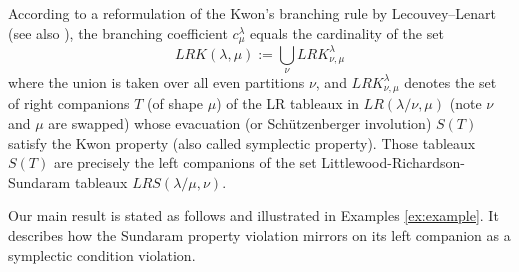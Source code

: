 \documentclass[reqno]{amsart}
\theoremstyle{tplain}
\begin{document}
According  to a reformulation of the Kwon’s branching rule by Lecouvey–Lenart \cite[Section 8]{leclen} (see also \cite{sathishtorres}),
the branching coefficient
$c^\lambda_\mu$
equals the cardinality of the set
$$
LRK(\lambda,\mu):=\bigcup_\nu
LRK^\lambda_{\nu,\mu}$$
where the union is taken over all even partitions $\nu$, and $LRK^\lambda_{\nu,\mu}$ denotes the set of right companions $T$ (of shape $\mu$) of the  LR tableaux in $LR(\lambda/\nu,\mu)$ (note  $\nu$ and $\mu$ are swapped) whose evacuation (or Sch\"utzenberger involution) $S(T)$  satisfy the Kwon property (also called symplectic property). Those tableaux $S(T)$ are precisely the left companions of the set Littlewood-Richardson-Sundaram tableaux $LRS(\lambda/\mu,\nu)$.



Our main result is stated as follows and illustrated in Examples \ref{ex:example}. It describes how the Sundaram property violation mirrors on its left companion as a symplectic condition violation.
\end{document}
